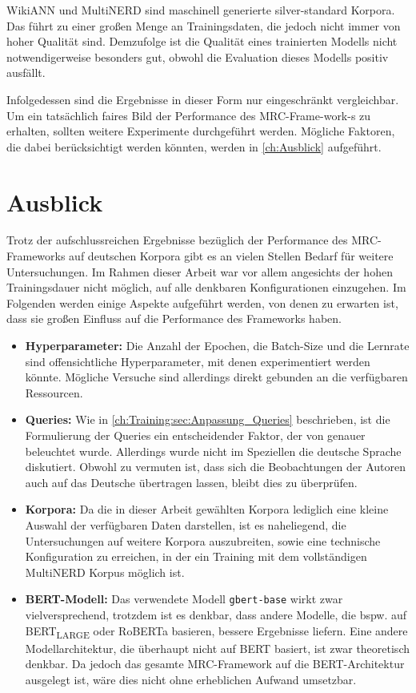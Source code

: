 WikiANN und MultiNERD sind maschinell generierte silver-standard Korpora. Das führt zu einer großen Menge an Trainingsdaten, die jedoch nicht immer von hoher Qualität sind. Demzufolge ist die Qualität eines trainierten Modells nicht notwendigerweise besonders gut, obwohl die Evaluation dieses Modells positiv ausfällt.

Infolgedessen sind die Ergebnisse in dieser Form nur eingeschränkt vergleichbar. Um ein tatsächlich faires Bild der Performance des MRC\--Frame-work-s zu erhalten, sollten weitere Experimente durchgeführt werden. Mögliche Faktoren, die dabei berücksichtigt werden könnten, werden in \autoref{ch:Ausblick} aufgeführt.

\chapter{Ausblick}
\label{ch:Ausblick}

Trotz der aufschlussreichen Ergebnisse bezüglich der Performance des MRC\--Frame\-work\-s auf deutschen Korpora gibt es an vielen Stellen Bedarf für weitere Untersuchungen. Im Rahmen dieser Arbeit war vor allem angesichts der hohen Trainingsdauer nicht möglich, auf alle denkbaren Konfigurationen einzugehen. Im Folgenden werden einige Aspekte aufgeführt werden, von denen zu erwarten ist, dass sie großen Einfluss auf die Performance des Frameworks haben.

\begin{itemize}
	\item \textbf{Hyperparameter:} Die Anzahl der Epochen, die Batch-Size und die Lernrate sind offensichtliche Hyperparameter, mit denen experimentiert werden könnte. Mögliche Versuche sind allerdings direkt gebunden an die verfügbaren Ressourcen.
	\item \textbf{Queries:} Wie in \autoref{ch:Training:sec:Anpassung_Queries} beschrieben, ist die Formulierung der Queries ein entscheidender Faktor, der von \cite{li2019unified} genauer beleuchtet wurde. Allerdings wurde nicht im Speziellen die deutsche Sprache diskutiert. Obwohl zu vermuten ist, dass sich die Beobachtungen der Autoren auch auf das Deutsche übertragen lassen, bleibt dies zu überprüfen.
	\item \textbf{Korpora:} Da die in dieser Arbeit gewählten Korpora lediglich eine kleine Auswahl der verfügbaren Daten darstellen, ist es naheliegend, die Untersuchungen auf weitere Korpora auszubreiten, sowie eine technische Konfiguration zu erreichen, in der ein Training mit dem vollständigen MultiNERD Korpus möglich ist.
	\item \textbf{BERT-Modell:} Das verwendete Modell \verb|gbert-base| wirkt zwar vielversprechend, trotzdem ist es denkbar, dass andere Modelle, die bspw. auf BERT\textsubscript{LARGE} oder RoBERTa basieren, bessere Ergebnisse liefern. Eine andere Modellarchitektur, die überhaupt nicht auf BERT basiert, ist zwar theoretisch denkbar. Da jedoch das gesamte MRC\--Frame\-work auf die BERT-Architektur ausgelegt ist, wäre dies nicht ohne erheblichen Aufwand umsetzbar.
\end{itemize}

